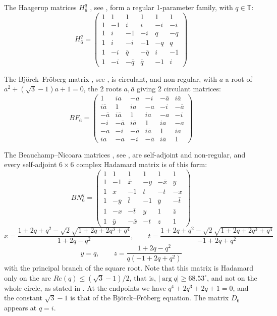 \documentclass[11pt]{amsart}
\newcommand{\T}{\mathbb T}
\begin{document}
\noindent The Haagerup matrices $H_6^q$ \cite{ha1}, see \cite[Proposition 6.17]{banicaHM}, form a regular 1-parameter family, with $q\in\T$:
$$H_6^q=\begin{pmatrix}
1&1&1&1&1&1\\
1&-1&i&i&-i&-i\\
1&i&-1&-i&q&-q\\
1&i&-i&-1&-q&q\\
1&-i&\bar{q}&-\bar{q}&i&-1\\
1&-i&-\bar{q}&\bar{q}&-1&i
\end{pmatrix}$$

\noindent The Bj\"orck--Fr\"oberg matrix \cite{bjf}, see \cite[Proposition 5.17]{banicaHM}, is circulant, and non-regular, with $a$ a root of $a^2+(\sqrt3-1)a+1=0$, the 2 roots $a,\bar{a}$ giving 2 circulant matrices:
$$BF_6=\begin{pmatrix}
1&ia&-a&-i&-\bar{a}&i\bar{a}\\
i\bar{a}&1&ia&-a&-i&-\bar{a}\\
-\bar{a}&i\bar{a}&1&ia&-a&-i\\
-i&-\bar{a}&i\bar{a}&1&ia&-a\\
-a&-i&-\bar{a}&i\bar{a}&1&ia\\
ia&-a&-i&-\bar{a}&i\bar{a}&1
\end{pmatrix}$$

\noindent The Beauchamp--Nicoara matrices \cite{ben}, see \cite[Theorem 5.18]{banicaHM}, are self-adjoint and non-regular, and every self-adjoint $6\times6$ complex Hadamard matrix is of this form:
$$BN_6^q=\begin{pmatrix}
1&1&1&1&1&1\\
1&-1&\bar{x}&-y&-\bar{x}&y\\
1&x&-1&t&-t&-x\\
1&-\bar{y}&\bar{t}&-1&\bar{y}&-\bar{t}\\
1&-x&-\bar{t}&y&1&\bar{z}\\
1&\bar{y}&-\bar{x}&-t&z&1
\end{pmatrix}$$
$$x=\frac{1+2q+q^2-\sqrt{2}\sqrt{1+2q+2q^3+q^4}}{1+2q-q^2},\qquad t=\frac{1+2q+q^2-\sqrt{2}\sqrt{1+2q+2q^3+q^4}}{-1+2q+q^2}$$
$$y=q,\qquad z=\frac{1+2q-q^2}{q(-1+2q+q^2)}$$
with the principal branch of the square root. Note that this matrix is Hadamard only on the arc $Re(q)\leq(\sqrt3-1)/2$, that is, $|\arg q|\geq68.53^\circ$, and not on the whole circle, as stated in \cite{banicaHM}. At the endpoints we have $q^4+2q^3+2q+1=0$, and the constant $\sqrt3-1$ is that of the Bj\"orck--Fr\"oberg equation. The matrix $D_6$ appears at $q=i$.
\end{document}
